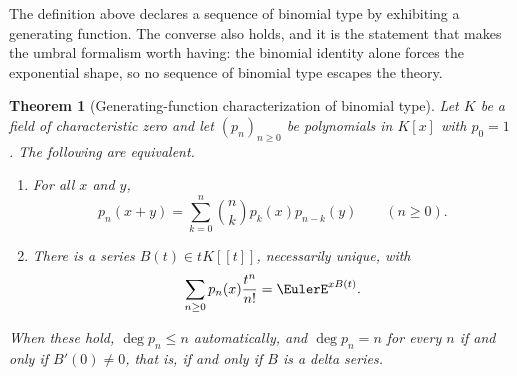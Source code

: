 \documentclass[11pt,a4paper,oneside,openany]{book}
\newtheorem{theorem}{Theorem}[chapter]
\theoremstyle{definition}
\theoremstyle{remark}
\begin{document}
The definition above declares a sequence of binomial type by exhibiting a
generating function.  The converse also holds, and it is the statement that
makes the umbral formalism worth having: the binomial identity alone forces the
exponential shape, so no sequence of binomial type escapes the theory.

\begin{theorem}[Generating-function characterization of binomial type]
\label{thm:merged-binomial-type-characterization}
Let $K$ be a field of characteristic zero and let $(p_n)_{n\geq0}$ be
polynomials in $K[x]$ with $p_0=1$.  The following are equivalent.
\begin{enumerate}
\item For all $x$ and $y$,
\begin{equation}
 p_n(x+y)=\sum_{k=0}^{n}\binom nkp_k(x)p_{n-k}(y)\qquad(n\geq0).   \label{eq:merged-binomial-type-law}
\end{equation}
\item There is a series $B(t)\in tK[[t]]$, necessarily unique, with
\begin{equation}
 \sum_{n\geq0}p_n(x)\frac{t^n}{n!}=\EulerE^{xB(t)}.                \label{eq:merged-binomial-type-egf}
\end{equation}
\end{enumerate}
When these hold, $\deg p_n\leq n$ automatically, and $\deg p_n=n$ for every $n$
if and only if $B'(0)\ne0$, that is, if and only if $B$ is a delta series.
\end{theorem}
\end{document}
